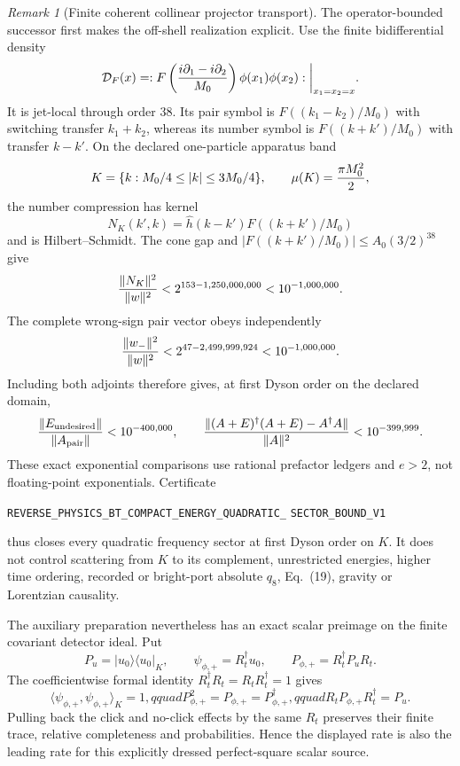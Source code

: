 \documentclass[11pt]{article}
\theoremstyle{definition}
\theoremstyle{remark}
\newtheorem{remark}[theorem]{Remark}
\begin{document}
\begin{remark}[Finite coherent collinear projector transport]
The operator-bounded successor first makes the off-shell realization
explicit.  Use the finite bidifferential density
\[
 {\cal D}_F(x)=:
 F\left({i\partial_1-i\partial_2\over M_0}\right)
 \phi(x_1)\phi(x_2):\bigg|_{x_1=x_2=x}.
\]
It is jet-local through order 38.  Its pair symbol is
$F((k_1-k_2)/M_0)$ with switching transfer $k_1+k_2$, whereas its number
symbol is $F((k+k')/M_0)$ with transfer $k-k'$.  On the declared
one-particle apparatus band
\[
 K=\{k:M_0/4\leq|k|\leq3M_0/4\},
 \qquad \mu(K)={\pi M_0^2\over2},
\]
the number compression has kernel
\[
 N_K(k',k)=\widehat h(k-k')F((k+k')/M_0)
\]
and is Hilbert--Schmidt.  The cone gap and
$|F((k+k')/M_0)|\leq A_0(3/2)^{38}$ give
\[
 {\|N_K\|^2\over\|w\|^2}
 <2^{153-1,250,000,000}<10^{-1,000,000}.
\]
The complete wrong-sign pair vector obeys independently
\[
 {\|w_-\|^2\over\|w\|^2}
 <2^{47-2,499,999,924}<10^{-1,000,000}.
\]
Including both adjoints therefore gives, at first Dyson order on the declared
domain,
\[
 {\|E_{\rm undesired}\|\over\|A_{\rm pair}\|}<10^{-400,000},
 \qquad
 {\|(A+E)^\dagger(A+E)-A^\dagger A\|\over\|A\|^2}<10^{-399,999}.
\]
These exact exponential comparisons use rational prefactor ledgers and
$e>2$, not floating-point exponentials.  Certificate
\par\noindent
\texttt{REVERSE\_PHYSICS\_BT\_COMPACT\_ENERGY\_QUADRATIC\_}
\allowbreak\texttt{SECTOR\_BOUND\_V1}
\par\noindent
thus closes every quadratic frequency sector at first Dyson order on $K$.
It does not control scattering from $K$ to its complement, unrestricted
energies, higher time ordering, recorded or bright-port absolute $q_8$,
Eq.~(19), gravity or
Lorentzian causality.

The auxiliary preparation nevertheless has an exact scalar preimage on the
finite covariant detector ideal.  Put
\[
 P_u=|u_0\rangle\langle u_0|_K,\qquad
 \psi_{\phi,+}=R_t^\dagger u_0,\qquad
 P_{\phi,+}=R_t^\dagger P_uR_t.
\]
The coefficientwise formal identity
$R_t^\dagger R_t=R_tR_t^\dagger=1$ gives
\[
 \langle\psi_{\phi,+},\psi_{\phi,+}\rangle_K=1,qquad
 P_{\phi,+}^2=P_{\phi,+}=P_{\phi,+}^\dagger,qquad
 R_tP_{\phi,+}R_t^\dagger=P_u.
\]
Pulling back the click and no-click effects by the same $R_t$ preserves their
finite trace, relative completeness and probabilities.  Hence the displayed
rate is also the leading rate for this explicitly dressed perfect-square
scalar source.


\end{remark}
\end{document}
